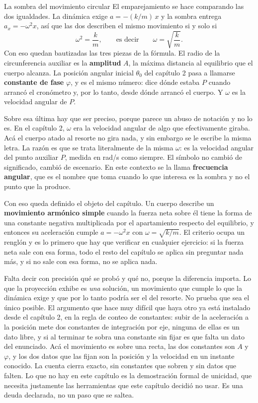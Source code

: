 \documentclass[11pt,openany]{book}
\begin{document}
\begin{bloque}{La sombra del movimiento circular}
El emparejamiento se hace comparando las dos igualdades. La dinámica exige $a = -(k/m)\,x$ y la sombra entrega $a_x = -\omega^2 x$, así que las dos describen el mismo movimiento si y solo si
\[
\omega^{2} = \frac{k}{m},
\qquad\text{es decir}\qquad
\omega = \sqrt{\frac{k}{m}} .
\]
Con eso quedan bautizadas las tres piezas de la fórmula. El radio de la circunferencia auxiliar es la \textbf{amplitud} $A$, la máxima distancia al equilibrio que el cuerpo alcanza. La posición angular inicial $\theta_0$ del capítulo 2 pasa a llamarse \textbf{constante de fase} $\varphi$, y es el mismo número: dice dónde estaba $P$ cuando arrancó el cronómetro y, por lo tanto, desde dónde arrancó el cuerpo. Y $\omega$ es la velocidad angular de $P$.

Sobre esa última hay que ser preciso, porque parece un abuso de notación y no lo es. En el capítulo 2, $\omega$ era la velocidad angular de algo que efectivamente giraba. Acá el cuerpo atado al resorte no gira nada, y sin embargo se le escribe la misma letra. La razón es que se trata literalmente de la misma $\omega$: es la velocidad angular del punto auxiliar $P$, medida en rad/s como siempre. El símbolo no cambió de significado, cambió de escenario. En este contexto se la llama \textbf{frecuencia angular}, que es el nombre que toma cuando lo que interesa es la sombra y no el punto que la produce.

Con eso queda definido el objeto del capítulo. Un cuerpo describe un \textbf{movimiento armónico simple} cuando la fuerza neta sobre él tiene la forma de una constante negativa multiplicada por el apartamiento respecto del equilibrio, y entonces su aceleración cumple $a = -\omega^2 x$ con $\omega = \sqrt{k/m}$. El criterio ocupa un renglón y es lo primero que hay que verificar en cualquier ejercicio: si la fuerza neta sale con esa forma, todo el resto del capítulo se aplica sin preguntar nada más, y si no sale con esa forma, no se aplica nada.

Falta decir con precisión qué se probó y qué no, porque la diferencia importa. Lo que la proyección exhibe es \emph{una} solución, un movimiento que cumple lo que la dinámica exige y que por lo tanto podría ser el del resorte. No prueba que sea el único posible. El argumento que hace muy difícil que haya otro ya está instalado desde el capítulo 2, en la regla de conteo de constantes: subir de la aceleración a la posición mete dos constantes de integración por eje, ninguna de ellas es un dato libre, y si al terminar te sobra una constante sin fijar es que falta un dato del enunciado. Acá el movimiento es sobre una recta, las dos constantes son $A$ y $\varphi$, y los dos datos que las fijan son la posición y la velocidad en un instante conocido. La cuenta cierra exacto, sin constantes que sobren y sin datos que falten. Lo que no hay en este capítulo es la demostración formal de unicidad, que necesita justamente las herramientas que este capítulo decidió no usar. Es una deuda declarada, no un paso que se saltea.


\end{bloque}
\end{document}
